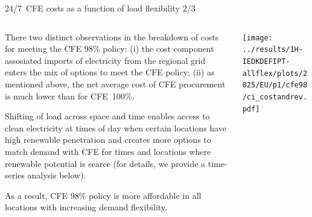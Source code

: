 \begin{frame}{24/7~CFE costs as a function of load flexibility 2/3}

  {\footnotesize
  \vspace{0.2cm}
  
  \begin{columns}[T]

  \begin{column}{6cm}
  There two distinct observations in the breakdown of costs for meeting the CFE 98\% policy: (i) the cost component assosiated imports of electricity from the regional grid enters the mix of options to meet the CFE policy; (ii) as mentioned above, the net average cost of CFE procurement is much lower than for CFE~100\%.

  \vspace{0.1cm}
  Shifting of load across space and time \alert{enables access to clean electricity} at times of day when certain locations have high renewable penetration and \alert{creates more options to match demand with CFE} for times and locations where renewable potential is scarce (for details, we provide a time-series analysis below). 

  \vspace{0.1cm}
  As a result, CFE 98\% policy is more affordable in all locations with increasing demand flexibility. 

  \end{column}

  \begin{column}{9cm}
    \centering
    \texttt{[image: ../results/1H-IEDKDEFIPT-allflex/plots/2025/EU/p1/cfe98/ci\_costandrev.pdf]}
  \end{column}

  \end{columns}
  }
\end{frame}




